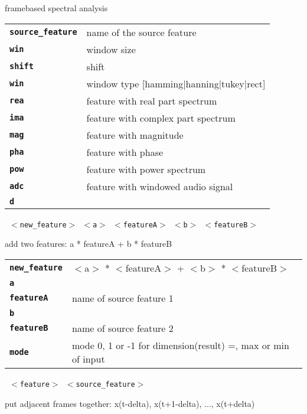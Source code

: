 \begin{description}
\begin{description}
        framebased spectral analysis

      \begin{tabular}{ll}
 \texttt{\textbf{source\_feature}} &  name of the source feature \\
 \texttt{\textbf{win}} &             window size  \\
 \texttt{\textbf{shift}} &            shift  \\
 \texttt{\textbf{win}} &              window type [hamming|hanning|tukey|rect]  \\
 \texttt{\textbf{rea}} &              feature with real part spectrum \\
 \texttt{\textbf{ima}} &              feature with complex part spectrum \\
 \texttt{\textbf{mag}} &              feature with magnitude \\
 \texttt{\textbf{pha}} &              feature with phase \\
 \texttt{\textbf{pow}} &              feature with power spectrum \\
 \texttt{\textbf{adc}} &              feature with windowed audio signal \\
 \texttt{\textbf{d}} &                  \\
      \end{tabular}
       \texttt{ $<$new\_feature$>$ $<$a$>$ $<$featureA$>$ $<$b$>$ $<$featureB$>$ } \

        add two features: a * featureA + b * featureB

      \begin{tabular}{ll}
 \texttt{\textbf{new\_feature}} &  $<$a$>$ * $<$featureA$>$ + $<$b$>$ * $<$featureB$>$ \\
 \texttt{\textbf{a}} &              \\
 \texttt{\textbf{featureA}} &     name of source feature 1 \\
 \texttt{\textbf{b}} &              \\
 \texttt{\textbf{featureB}} &     name of source feature 2 \\
 \texttt{\textbf{mode}} &          mode 0, 1 or -1 for dimension(result) =, max or min of input  \\
      \end{tabular}
       \texttt{ $<$feature$>$ $<$source\_feature$>$ } \

        put adjacent frames together: x(t-delta), x(t+1-delta), ..., x(t+delta)


\end{description}
\end{description}
